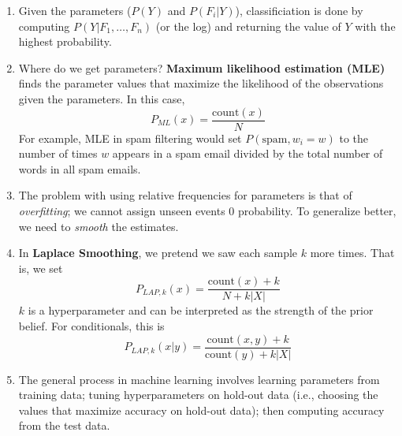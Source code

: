 \documentclass[10pt]{article}
\begin{document}
\begin{multicols}{2}
\begin{addmargin}[0.8em]{0.5em}
\begin{enumerate}[label=(\alph*)]
        \item Given the parameters ($P(Y)$ and $P(F_i|Y)$), classificiation is done by computing $P(Y|F_1,\ldots,F_n)$ (or the log) and returning the value of $Y$ with the highest probability. 
        \item Where do we get parameters? \textbf{Maximum likelihood estimation (MLE)} finds the parameter values that maximize the likelihood of the observations given the parameters. In this case, $$P_{ML}(x) = \frac{\text{count}(x)}{N}$$ For example, MLE in spam filtering would set $P(\text{spam}, w_i=w)$ to the number of times $w$ appears in a spam email divided by the total number of words in all spam emails.
        \item The problem with using relative frequencies for parameters is that of \textit{overfitting}; we cannot assign unseen events 0 probability. To generalize better, we need to \textit{smooth} the estimates. 
        \item In \textbf{Laplace Smoothing}, we pretend we saw each sample $k$ more times. That is, we set
        $$P_{LAP,k}(x) = \frac{\text{count}(x)+k}{N+k|X|}$$
        $k$ is a hyperparameter and can be interpreted as the strength of the prior belief. For conditionals, this is
        $$P_{LAP,k}(x|y) = \frac{\text{count}(x,y)+k}{\text{count}(y)+k|X|}$$
        \item The general process in machine learning involves learning parameters from training data; tuning hyperparameters on hold-out data (i.e., choosing the values that maximize accuracy on hold-out data); then computing accuracy from the test data.
        
    \end{enumerate}

\end{addmargin}
\end{multicols}
\end{document}
